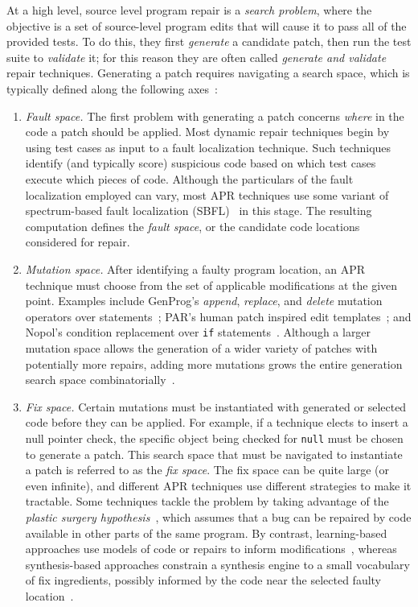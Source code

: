 \documentclass[10pt, conference]{IEEEtran}
\begin{document}
At a high level, source level program repair is a \emph{search problem}, where
the objective is a set of source-level program edits that will cause it to pass
all of the provided tests. To do this, they first \emph{generate} a candidate
patch, then run the test suite to \emph{validate} it; for this reason they are
often called \emph{generate and validate} repair techniques. Generating a patch
requires navigating a search space, which is typically defined along the
following axes~\cite{ae,sqjo}:
\begin{enumerate}[wide]

\item \emph{Fault space.} The first problem with generating a patch concerns
  \emph{where} in the code a patch should be applied. Most dynamic repair
  techniques begin by using test cases as input to a fault localization
  technique. Such techniques identify (and typically score) suspicious code
  based on which test cases execute which pieces of code. Although the
  particulars of the fault localization employed can vary, most APR techniques
  use some variant of spectrum-based fault localization (SBFL)~\cite{ochiai} in
  this stage. The resulting computation defines the \emph{fault space}, or the
  candidate code locations considered for repair.

\item \emph{Mutation space.} After identifying a faulty program location, an APR
  technique must choose from the set of applicable modifications at the given
  point. Examples include GenProg's \emph{append}, \emph{replace}, and
  \emph{delete} mutation operators over statements~\cite{genprog-operators};
  PAR's human patch inspired edit templates~\cite{par}; and Nopol's condition
  replacement over \texttt{if} statements~\cite{Xuan17}. Although a larger
  mutation space allows the generation of a wider variety of patches with
  potentially more repairs, adding more mutations grows the entire generation
  search space combinatorially~\cite{long-search-spaces}.

\item \emph{Fix space.} Certain mutations must be instantiated with generated or
  selected code before they can be applied. For example, if a technique elects
  to insert a null pointer check, the specific object being checked for
  \texttt{null} must be chosen to generate a patch. This search space that must
  be navigated to instantiate a patch is referred to as the \emph{fix space}.
  The fix space can be quite large (or even infinite), and different APR
  techniques use different strategies to make it tractable. Some techniques
  tackle the problem by taking advantage of the \emph{plastic surgery
    hypothesis}~\cite{plastic}, which assumes that a bug can be repaired by code
  available in other parts of the same program. By contrast, learning-based
  approaches use models of code or repairs to inform
  modifications~\cite{prophet}, whereas synthesis-based approaches constrain a
  synthesis engine to a small vocabulary of fix ingredients, possibly informed
  by the code near the selected faulty location~\cite{angelix,s3}.
\end{enumerate}
\end{document}
